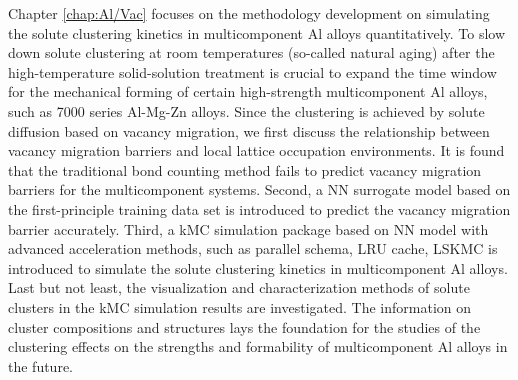 Chapter \ref{chap:Al/Vac} focuses on the methodology development on simulating the solute clustering kinetics in multicomponent Al alloys quantitatively. To slow down solute clustering at room temperatures (so-called natural aging) after the high-temperature solid-solution treatment is crucial to expand the time window for the mechanical forming of certain high-strength multicomponent Al alloys, such as 7000 series Al-Mg-Zn alloys. Since the clustering is achieved by solute diffusion based on vacancy migration, we first discuss the relationship between vacancy migration barriers and local lattice occupation environments. It is found that the traditional bond counting method fails to predict vacancy migration barriers for the multicomponent systems. Second, a \acf{NN} surrogate model based on the first-principle training data set is introduced to predict the vacancy migration barrier accurately. Third, a \acf{kMC} simulation package based on \ac{NN} model with advanced acceleration methods, such as parallel schema, \acf{LRU} cache, \acf{LSKMC} is introduced to simulate the solute clustering kinetics in multicomponent Al alloys. Last but not least, the visualization and characterization methods of solute clusters in the kMC simulation results are investigated. The information on cluster compositions and structures lays the foundation for the studies of the clustering effects on the strengths and formability of multicomponent Al alloys in the future.


